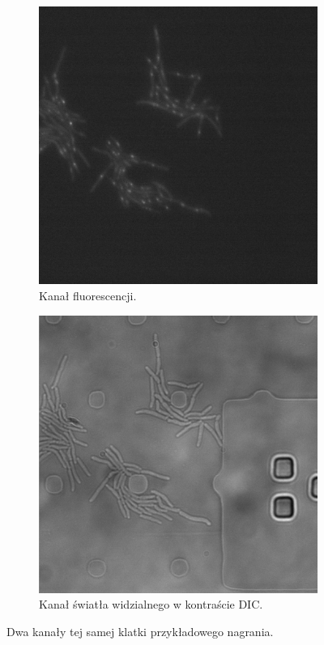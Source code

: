 \documentclass[declaration,shortabstract,mgr]{iithesis}
\begin{document}
\begin{figure}[h]
  \centering

  \begin{subfigure}[t]{.45\textwidth}
    \centering
    \includegraphics[width=\textwidth]{images/input-channel-1.png}
    \caption{\centering Kanał fluorescencji.}
  \end{subfigure}
  \hfill
  \begin{subfigure}[t]{.45\textwidth}
    \centering
    \includegraphics[width=\textwidth]{images/input-channel-2.png}
    \caption{\centering Kanał światła widzialnego w kontraście DIC.}
  \end{subfigure}
  \hfill

  \caption{Dwa kanały tej samej klatki przykładowego nagrania.}
  \label{fig:input-images}
\end{figure}
\end{document}
